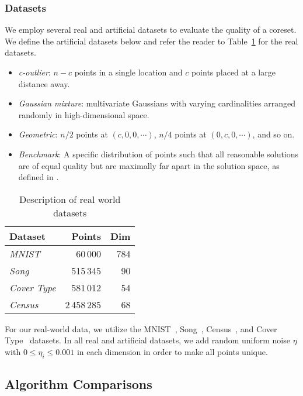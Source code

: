 \subsubsection{Datasets}


We employ several real and artificial datasets to evaluate the quality of a coreset. We define the artificial datasets below and refer the reader to
Table~\cref{tbl:datasets} for the real datasets.

\begin{itemize}
    \item \emph{c-outlier}: $n-c$ points in a single location and $c$ points placed at a large distance away.
    \item \emph{Gaussian mixture}: multivariate Gaussians with varying cardinalities arranged randomly in high-dimensional space.
    \item \emph{Geometric}: $n/2$ points at $(c, 0, 0, \cdots)$, $n/4$ points at $(0, c, 0, \cdots)$, and so on.
    \item \emph{Benchmark}: A specific distribution of points such that all reasonable solutions are of equal quality but are maximally far
            apart in the solution space, as defined in \cite{chrisESA}.
\end{itemize}

\begin{table}[htbp]
    \label{tbl:datasets}
    \centering
    \begin{tabular}{lrr}
        Dataset & Points & Dim \\
        \hline
        \emph{MNIST} & 60\,000 & 784 \\
        \emph{Song} & 515\,345 & 90 \\
        \emph{Cover Type} & 581\,012 & 54 \\
        \emph{Census} & 2\,458\,285 & 68
    \end{tabular}
    \caption{Description of real world datasets}
\end{table}

For our real-world data, we utilize the MNIST~\cite{mnist}, Song~\cite{song}, Census~\cite{census}, and Cover Type~\cite{covtype} datasets. In
all real and artificial datasets, we add random uniform noise $\eta$ with $0 \leq \eta_i \leq 0.001$ in each dimension in order to make all points unique.

\subsection{Algorithm Comparisons}
\label{ssec:alg_qualities}

